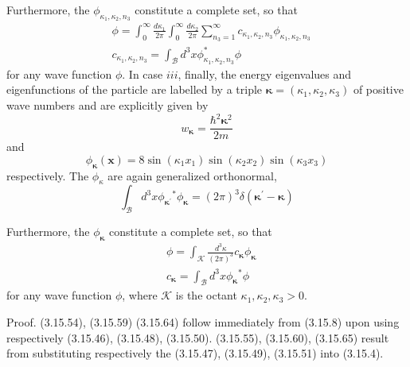 \documentclass{article}
\begin{document}
Furthermore, the $\phi_{\kappa_{1}, \kappa_{2}, n_{3}}$ constitute a complete set, so that
$$
\begin{align*}
& \phi=\int_{0}^{\infty} \frac{d \kappa_{1}}{2 \pi} \int_{0}^{\infty} \frac{d \kappa_{2}}{2 \pi} \sum_{n_{3}=1}^{\infty} c_{\kappa_{1}, \kappa_{2}, n_{3}} \phi_{\kappa_{1}, \kappa_{2}, n_{3}}  \tag{3.15.62}\\
& c_{\kappa_{1}, \kappa_{2}, n_{3}}=\int_{\mathcal{B}} d^{3} x \phi_{\kappa_{1}, \kappa_{2}, n_{3}}^{*} \phi \tag{3.15.63}
\end{align*}
$$
for any wave function $\phi$. In case $i i i$, finally, the energy eigenvalues and eigenfunctions of the particle are labelled by a triple $\boldsymbol{\kappa}=\left(\kappa_{1}, \kappa_{2}, \kappa_{3}\right)$ of positive wave numbers and are explicitly given by
$$
\begin{equation*}
w_{\boldsymbol{\kappa}}=\frac{\hbar^{2} \boldsymbol{\kappa}^{2}}{2 m} \tag{3.15.64}
\end{equation*}
$$
and
$$
\begin{equation*}
\phi_{\boldsymbol{\kappa}}(\boldsymbol{x})=8 \sin \left(\kappa_{1} x_{1}\right) \sin \left(\kappa_{2} x_{2}\right) \sin \left(\kappa_{3} x_{3}\right) \tag{3.15.65}
\end{equation*}
$$
respectively. The $\phi_{\kappa}$ are again generalized orthonormal,
$$
\begin{equation*}
\int_{\mathcal{B}} d^{3} x \phi_{\boldsymbol{\kappa}^{\prime}}{ }^{*} \phi_{\boldsymbol{\kappa}}=(2 \pi)^{3} \delta\left(\boldsymbol{\kappa}^{\prime}-\boldsymbol{\kappa}\right) \tag{3.15.66}
\end{equation*}
$$

Furthermore, the $\phi_{\boldsymbol{\kappa}}$ constitute a complete set, so that
$$
\begin{align*}
& \phi=\int_{\mathcal{K}} \frac{d^{3} \kappa}{(2 \pi)^{3}} c_{\boldsymbol{\kappa}} \phi_{\boldsymbol{\kappa}}  \tag{3.15.67}\\
& c_{\boldsymbol{\kappa}}=\int_{\mathcal{B}} d^{3} x \phi_{\boldsymbol{\kappa}}{ }^{*} \phi \tag{3.15.68}
\end{align*}
$$
for any wave function $\phi$, where $\mathcal{K}$ is the octant $\kappa_{1}, \kappa_{2}, \kappa_{3}>0$.

Proof. (3.15.54), (3.15.59) (3.15.64) follow immediately from (3.15.8) upon using respectively (3.15.46), (3.15.48), (3.15.50). (3.15.55), (3.15.60), (3.15.65) result from substituting respectively the (3.15.47), (3.15.49), (3.15.51) into (3.15.4).
\end{document}
